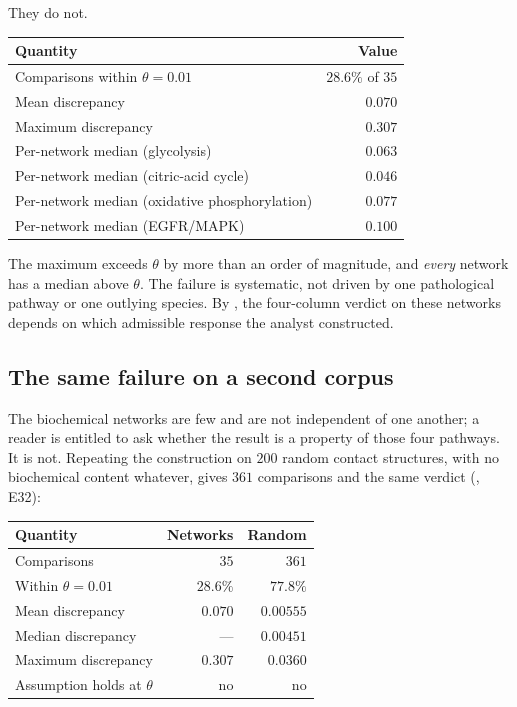 \documentclass[11pt,twocolumn,a4paper]{article}
\theoremstyle{plain}
\theoremstyle{definition}
\theoremstyle{remark}
\begin{document}
They do not.

\begin{center}
\begin{tabular}{@{}lr@{}}
\toprule
Quantity & Value \\
\midrule
Comparisons within $\theta=0.01$ & $28.6\%$ of $35$ \\
Mean discrepancy & $0.070$ \\
Maximum discrepancy & $0.307$ \\
Per-network median (glycolysis) & $0.063$ \\
Per-network median (citric-acid cycle) & $0.046$ \\
Per-network median (oxidative phosphorylation) & $0.077$ \\
Per-network median (EGFR/MAPK) & $0.100$ \\
\bottomrule
\end{tabular}
\end{center}

The maximum exceeds $\theta$ by more than an order of magnitude, and
\emph{every} network has a median above $\theta$. The failure is
systematic, not driven by one pathological pathway or one outlying
species. By , the four-column verdict on these
networks depends on which admissible response the analyst constructed.

\subsection{The same failure on a second corpus}

The biochemical networks are few and are not independent of one another;
a reader is entitled to ask whether the result is a property of those
four pathways. It is not. Repeating the construction on $200$ random
contact structures, with no biochemical content whatever, gives $361$
comparisons and the same verdict (, E32):

\begin{center}
\begin{tabular}{@{}lrr@{}}
\toprule
Quantity & Networks & Random \\
\midrule
Comparisons & $35$ & $361$ \\
Within $\theta=0.01$ & $28.6\%$ & $77.8\%$ \\
Mean discrepancy & $0.070$ & $0.00555$ \\
Median discrepancy & --- & $0.00451$ \\
Maximum discrepancy & $0.307$ & $0.0360$ \\
Assumption holds at $\theta$ & no & no \\
\bottomrule
\end{tabular}
\end{center}
\end{document}
